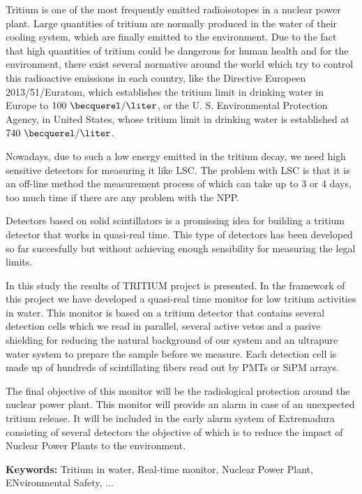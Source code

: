 Tritium is one of the most frequently emitted radioisotopes in a nuclear power plant. Large quantities of tritium are normally produced in the water of their cooling system, which are finally emitted to the environment. Due to the fact that high quantities of tritium could be dangerous for human health and for the environment, there exist several normative around the world which try to control this radioactive emissions in each country, like the Directive Europeen 2013/51/Euratom, which establishes the tritium limit in drinking water in Europe to $100~\becquerel/\liter$, or the U. S. Environmental Protection Agency, in United States, whose tritium limit in drinking water is established at $740~\becquerel/\liter$.

Nowadays, due to such a low energy emitted in the tritium decay, we need high sensitive detectors for measuring it like LSC. The problem with LSC is that it is an off-line method the measurement process of which can take up to 3 or 4 days, too much time if there are any problem with the NPP.

Detectors based on solid scintillators is a promissing idea for building a tritium detector that works in quasi-real time. This type of detectors has been developed so far succesfully but without achieving enough sensibility for measuring the legal limits.

In this study the results of TRITIUM project is presented. In the framework of this project we have developed a quasi-real time monitor for low tritium activities in water. This monitor is based on a tritium detector that contains several detection cells which we read in parallel, several active vetos and a pasive shielding for reducing the natural background of our system and an ultrapure water system to prepare the sample before we measure. Each detection cell is made up of hundreds of scintillating fibers read out by PMTs or SiPM arrays.

The final objective of this monitor will be the radiological protection around the nuclear power plant. This monitor will provide an alarm in case of an unexpected tritium release. It will be included in the early alarm system of Extremadura consisting of several detectors the objective of which is to reduce the impact of Nuclear Power Plants to the environment.

\vspace{1cm}

\textbf{Keywords:} Tritium in water, Real-time monitor, Nuclear Power Plant, ENvironmental Safety, ...